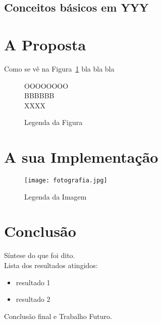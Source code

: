 \documentclass{article}
\begin{document}
\subsection{Conceitos básicos em YYY}

\section{A Proposta}
Como se vê na Figura~\ref{figuraA} bla bla bla
\begin{figure}
\begin{center}
OOOOOOOO\\
BBBBBB\\
XXXX
\caption{Legenda da Figura} \label{figuraA}
\end{center}
\end{figure}

\section{A sua Implementação}

\begin{figure}[htbp]
\begin{center}
\texttt{[image: fotografia.jpg]}
\caption{Legenda da Imagem} \label{figuraB}
\end{center}
\end{figure}

\section{Conclusão}
Síntese do que foi dito.\\
Lista dos resultados atingidos:
\begin{itemize}
\item resultado 1
\item resultado 2
\end{itemize}
Conclusão final e Trabalho Futuro.
\end{document}
